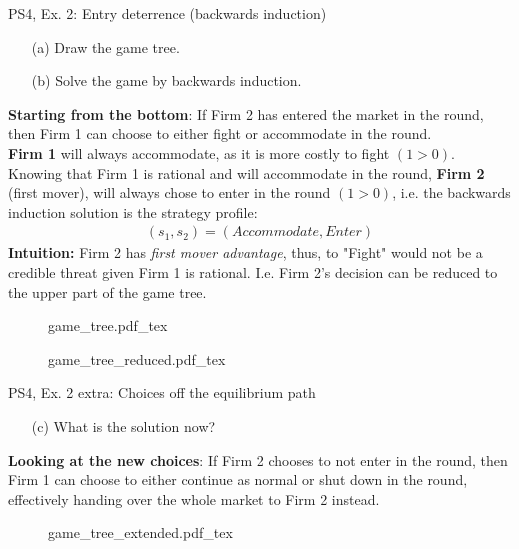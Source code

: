 \begin{frame}{PS4, Ex. 2: Entry deterrence (backwards induction)}
  \begin{multicols}{2}
    \begin{itemize}
      \item[(a)] Draw the game tree.
      \item[(b)] Solve the game by backwards induction.
    \end{itemize}
    \textbf{Starting from the bottom}: If Firm 2 has entered the market in the  round, then Firm 1 can choose to either fight or accommodate in the  round.\\\medskip
    \textbf{Firm 1} will always accommodate, as it is more costly to fight $(1>0)$.\\\medskip
    Knowing that Firm 1 is rational and will accommodate in the  round, \textbf{Firm 2} (first mover), will always chose to enter in the  round $(1>0)$, i.e. the backwards induction solution is the strategy profile:
      \begin{align*}
        (s_1,s_2)=(Accommodate,Enter)
      \end{align*}
    \textbf{Intuition:} Firm 2 has \textit{first mover advantage}, thus, to "Fight" would not be a credible threat given Firm 1 is rational. I.e. Firm 2's decision can be reduced to the upper part of the game tree.
  \vfill\null \columnbreak
    \begin{figure}[!h]
      \begin{center}
      \def\svgwidth{1.0\columnwidth}
      {game_tree.pdf_tex}
      \end{center}
    \end{figure}
    \begin{figure}[!h]
      \begin{center}
      \def\svgwidth{1.0\columnwidth}
      {game_tree_reduced.pdf_tex}
      \end{center}
    \end{figure}
  \vfill\null
  \end{multicols}
\end{frame}
\begin{frame}{PS4, Ex. 2 extra: Choices off the equilibrium path}
  \begin{multicols}{2}
    \begin{itemize}
      \item[(c)] What is the solution now?
    \end{itemize}
    \textbf{Looking at the new choices}: If Firm 2 chooses to not enter in the  round, then Firm 1 can choose to either continue as normal or shut down in the  round, effectively handing over the whole market to Firm 2 instead.
  \vfill\null \columnbreak
    \begin{figure}[!h]
      \begin{center}
      \def\svgwidth{1.0\columnwidth}
      {game_tree_extended.pdf_tex}
      \end{center}
    \end{figure}
  \vfill\null
  \end{multicols}
\end{frame}
